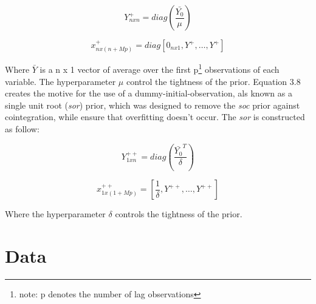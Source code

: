 \documentclass[11pt,preprint, authoryear]{elsarticle}
\numberwithin{equation}{section}
\numberwithin{figure}{section}
\numberwithin{table}{section}
\let\rmarkdownfootnote\footnote%
\def\footnote{\protect\rmarkdownfootnote}
\begin{document}
\begin{equation}
Y_{nxn}^{+} = diag\left(\frac{\bar{Y_0}}{\mu}\right)
\end{equation}

\begin{equation}
x_{nx(n+Mp)}^{+} = diag\left[0_{nx1},Y^+,…,Y^+\right]
\end{equation}

Where \(\bar{Y}\) is a n x 1 vector of average over the first
p\footnote{note: p denotes the number of lag observations} observations
of each variable. The hyperparameter \(\mu\) control the tightness of
the prior. Equation 3.8 creates the motive for the use of a
dummy-initial-observation, als known as a single unit root (\emph{sor})
prior, which was designed to remove the \emph{soc} prior against
cointegration, while ensure that overfitting doesn't occur. The
\emph{sor} is constructed as follow:

\begin{equation}
Y_{1xn}^{++} = diag\left(\frac{\bar{Y_0}^T}{\delta}\right)
\end{equation}

\begin{equation}
x_{1x(1+Mp)}^{++} = \left[\frac{1}{\delta},Y^{++}, …, Y^{++}\right]
\end{equation}

Where the hyperparameter \(\delta\) controls the tightness of the prior.

\hypertarget{data}{%
\section{Data}\label{data}}
\end{document}
